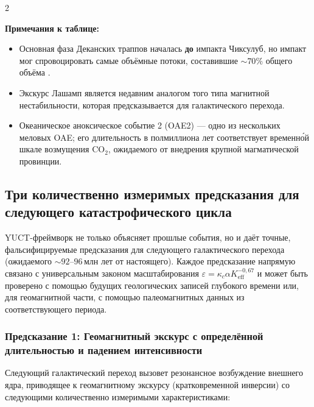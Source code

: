 \documentclass[11pt,a4paper]{article}
\begin{document}
	\begin{multicols}{2}
		
		\noindent
		\textbf{Примечания к таблице:}
		\begin{itemize}
			\item Основная фаза Деканских траппов началась \textbf{до} импакта Чиксулуб,
			но импакт мог спровоцировать самые объёмные потоки, составившие \(\sim 70\%\) общего объёма \cite{DeccanTriggering}.
			\item Экскурс Лашамп является недавним аналогом того типа магнитной
			нестабильности, которая предсказывается для галактического перехода.
			\item Океаническое аноксическое событие 2 (OAE2) — одно из нескольких меловых OAE; его
			длительность в полмиллиона лет соответствует временно́й шкале возмущения CO\(_2\),
			ожидаемого от внедрения крупной магматической провинции.
		\end{itemize}
		
		
		\subsection{Три количественно измеримых предсказания для следующего катастрофического цикла}
		
		YUCT-фреймворк не только объясняет прошлые события, но и даёт точные,
		фальсифицируемые предсказания для следующего галактического перехода (ожидаемого
		\(\sim 92\)–\(96\) млн лет от настоящего). Каждое предсказание напрямую связано с универсальным
		законом масштабирования \(\varepsilon = \kappa_c \alpha K_{\mathrm{eff}}^{-0,67}\)
		и может быть проверено с помощью будущих геологических записей глубокого времени или, для
		геомагнитной части, с помощью палеомагнитных данных из соответствующего периода.
		
		\subsubsection{Предсказание 1: Геомагнитный экскурс с определённой длительностью и падением интенсивности}
		
		Следующий галактический переход вызовет резонансное возбуждение
		внешнего ядра, приводящее к геомагнитному экскурсу (кратковременной инверсии)
		со следующими количественно измеримыми характеристиками:
		

\end{multicols}
\end{document}
